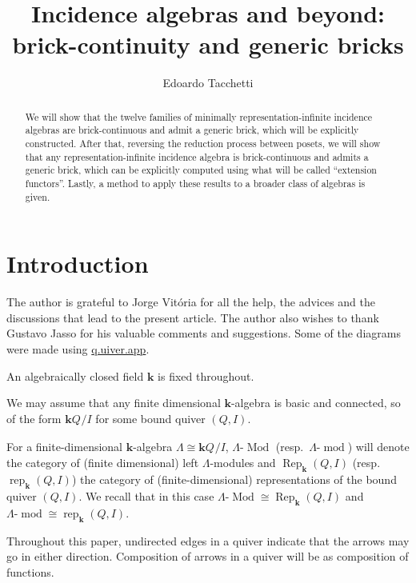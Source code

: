 \documentclass[10pt,oneside, a4paper,reqno]{amsart}
\title{Incidence algebras and beyond: brick-continuity and generic bricks}
\author{Edoardo Tacchetti}
\theoremstyle{definition}
\newcommand{\K}{\mathbf{k}}                         %
\newcommand{\Rep}[1]{\operatorname{Rep}_\K(#1)}     %
\newcommand{\Repf}[1]{\operatorname{rep}_\K(#1)}    %
\newcommand{\Mod}[1]{#1\text{-}\operatorname{Mod}}  %
\newcommand{\Modf}[1]{#1\text{-}\operatorname{mod}} %
\newcommand{\palgebra}[1]{\K Q_{#1}}        %
\newcommand{\Paragraphtitlebf}[1]{\vspace{1em}{\bfseries \noindent #1}}
\begin{document}
	
	
	\begin{abstract}
		We will show that the twelve families of minimally representation-infinite incidence algebras are brick-continuous and admit a generic brick, which will be explicitly constructed. After that, reversing the reduction process between posets, we will show that any representation-infinite incidence algebra is brick-continuous and admits a generic brick, which can be explicitly computed using what will be called ``extension functors''. Lastly, a method to apply these results to a broader class of algebras is given.
	\end{abstract}
	
	\maketitle
	\vspace{-1em}
	\tableofcontents

	\section*{Introduction}		
	
	
	\Paragraphtitlebf{Acknowledgments.} The author is grateful to Jorge Vitória for all the help, the advices and the discussions that lead to the present article.	The author also wishes to thank Gustavo Jasso for his valuable comments and suggestions. Some of the diagrams were made using \href{https://q.uiver.app/}{q.uiver.app}.
	
	\Paragraphtitlebf{Notation and conventions.} An algebraically closed field $\K$ is fixed throughout. 
	
	We may assume that any finite dimensional $\K$-algebra is basic and connected, so of the form $\palgebra{}/I$ for some bound quiver $(Q,I)$.
	
	For a finite-dimensional $\K$-algebra $\Lambda\cong\palgebra{}/I$, $\Mod{\Lambda}$ (resp.~$\Modf{\Lambda}$) will denote the category of (finite dimensional) left $\Lambda$-modules and $\Rep{Q,I}$ (resp.~$\Repf{Q,I}$) the category of (finite-dimensional) representations of the bound quiver $(Q,I)$. We recall that in this case $\Mod{\Lambda}\cong\Rep{Q,I}$ and $\Modf{\Lambda}\cong\Repf{Q,I}$.
	
	Throughout this paper, undirected edges in a quiver indicate that the arrows may go in either direction. Composition of arrows in a quiver will be as composition of functions.
	
\end{document}
